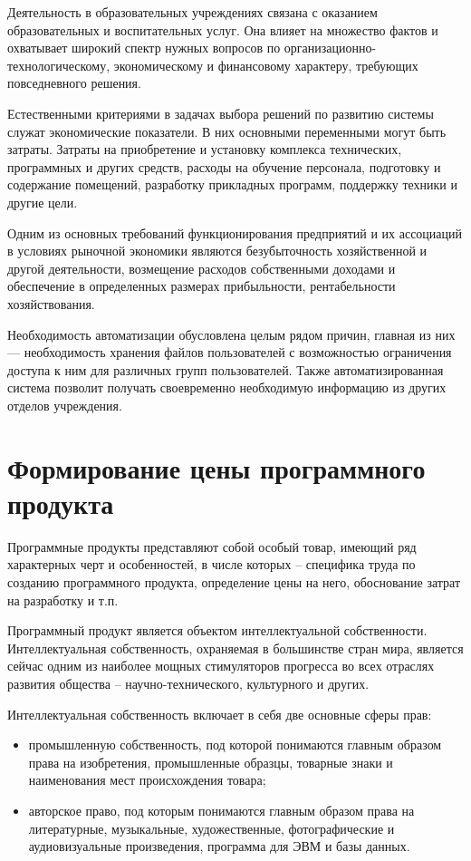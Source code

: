 \documentclass[utf8,usehyperref,12pt]{G7-32}
\begin{document}
Деятельность в образовательных учреждениях связана с оказанием образовательных и воспитательных услуг. Она влияет на множество  фактов  и  охватывает широкий спектр нужных вопросов по организационно-технологическому, экономическому и финансовому характеру, требующих повседневного решения.

Естественными критериями в задачах выбора решений по развитию системы служат экономические показатели. В них основными переменными могут быть затраты. Затраты на приобретение и установку комплекса технических, программных и других средств, расходы на обучение персонала, подготовку и содержание помещений, разработку прикладных программ, поддержку техники и другие цели.

Одним из основных требований функционирования предприятий и их ассоциаций в условиях рыночной экономики являются безубыточность хозяйственной и другой деятельности, возмещение расходов собственными доходами и обеспечение в определенных размерах прибыльности, рентабельности хозяйствования.

Необходимость автоматизации обусловлена целым рядом причин, главная из них — необходимость хранения файлов пользователей с возможностью ограничения доступа к ним для различных групп пользователей. Также автоматизированная система позволит получать своевременно необходимую информацию из других отделов учреждения.

\section{Формирование цены программного продукта}
Программные продукты представляют собой особый товар, имеющий ряд характерных черт и особенностей, в числе которых – специфика труда по созданию программного продукта, определение цены на него, обоснование затрат на разработку и т.п.

Программный продукт является объектом интеллектуальной собственности. Интеллектуальная собственность, охраняемая в большинстве стран мира, является сейчас одним из наиболее мощных стимуляторов прогресса во всех отраслях развития общества – научно-технического, культурного и других.

Интеллектуальная собственность включает в себя две основные сферы прав: 
\begin{itemize}
 \item промышленную собственность, под которой понимаются главным образом права на изобретения, промышленные образцы, товарные знаки и наименования мест происхождения товара;
 \item авторское право, под которым понимаются главным образом права на литературные, музыкальные, художественные, фотографические и аудиовизуальные произведения, программа для ЭВМ и базы данных.
\end{itemize}
\end{document}
